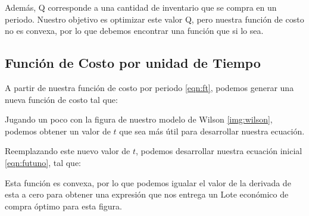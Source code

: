 Además, Q corresponde a una cantidad de inventario que se compra en un periodo. Nuestro objetivo es optimizar este valor Q, pero nuestra función de costo no es convexa, por lo que debemos encontrar una función que si lo sea.

\subsection{Función de Costo por unidad de Tiempo}
A partir de nuestra función de costo por periodo \ref{eqn:ft}, podemos generar una nueva función de costo tal que:


Jugando un poco con la figura de nuestro modelo de Wilson \ref{img:wilson}, podemos obtener un valor de $t$ que sea más útil para desarrollar nuestra ecuación.


Reemplazando este nuevo valor de $t$, podemos desarrollar nuestra ecuación inicial \ref{eqn:futuno}, tal que:


Esta función es convexa, por lo que podemos igualar el valor de la derivada de esta a cero para obtener una expresión que nos entrega un Lote económico de compra óptimo para esta figura.




